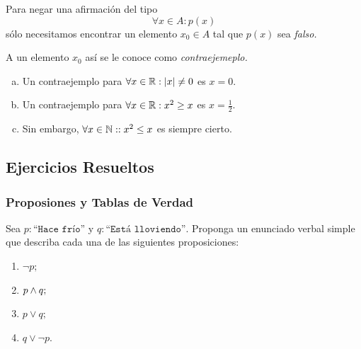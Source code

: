 \documentclass[xcolor={svgnames},
  hyperref={colorlinks}, 
  spanish, 12pt]{beamer}
\numberwithin{equation}{section} %
\numberwithin{figure}{section} %
\begin{document}
\begin{frame}
 \begin{rem}
  Para negar una afirmaci\'on del tipo $$\forall x \in A: p(x)$$ s\'olo necesitamos encontrar un elemento $x_{0}\in A$ tal que $p(x)$ sea \emph{falso.}
  \pause
  
  A un elemento $x_{0}$ as\'i se le conoce como \emph{contraejemeplo.}
 \end{rem}

\end{frame}

\begin{frame}
 \begin{exmp}
 \label{lip:4.11}
  \begin{enumerate}[(a)]
   \item 
  Un contraejemplo para $\forall x \in \mathbb{R}: \left|x\right|\neq 0$ es $x=0.$  \pause
   \item 
  Un contraejemplo para $\forall x \in \mathbb{R}: x^{2}\geq x$ es $x=\frac{1}{2}.$  \pause
   \item 
  Sin embargo, $\forall x \in \mathbb{N}: : x^{2}\leq x$ es siempre cierto.
  \end{enumerate}

 \end{exmp}

\end{frame}

\subsection{Ejercicios Resueltos}

\subsubsection{Proposiones y Tablas de Verdad}

\begin{frame}
 \begin{solved}
  Sea $p:\texttt{``Hace fr\'io''}$ y $q:\texttt{``Est\'a lloviendo''.}$ Proponga un enunciado verbal simple que describa cada una de las siguientes proposiciones:
  \begin{enumerate}
   \item $\neg p;$
   \item $p \wedge q;$
   \item $p \vee q;$
   \item $q \vee \neg p.$
  \end{enumerate}

 \end{solved}

\end{frame}
\end{document}
